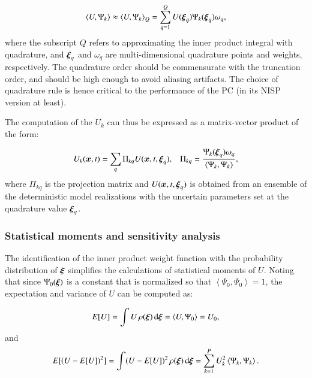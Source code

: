 \begin{equation}
  \left< U, \Psi_k \right> 
\approx \left< U, \Psi_k \right>_Q
= \sum_{q=1}^Q U(\xxi_q) \Psi_k(\xxi_q) \omega_q,
\end{equation}
where the subscript $Q$ refers to approximating the inner product integral with
quadrature, and $\xxi_q$ and $\omega_q$ are multi-dimensional quadrature points and weights,
respectively. The quadrature order should be commensurate with the
truncation order, and should be high enough to avoid aliasing artifacts.
The choice of quadrature rule is hence critical to the performance
of the PC (in its NISP version at least). 

The computation of the ${U}_k$ can thus be expressed as a matrix-vector product of the form:

\begin{equation} 
 U_k(\bm{x},t)=\sum_q \Pi_{kq} U(\bm{x},t,\xxi_q),\;\;\;
 \Pi_{kq}=\frac{\Psi_k(\xxi_q)\omega_q}{\left< \Psi_k, \Psi_k \right>},
\end{equation} 
where $\Pi_{kq}$ is the projection matrix and $U(\bm{x},t,\xxi_q)$ is obtained
from an ensemble of the deterministic model realizations with the uncertain parameters set at
the quadrature value $\xxi_q$. 


\subsubsection{Statistical moments and sensitivity analysis}
The identification of the inner product weight function
with the probability distribution of $\xxi$ simplifies the calculations of statistical moments of $U$. 
Noting that since $\Psi_0(\xxi)$ is a constant that is normalized so that 
$\left<\Psi_0,\Psi_0\right>=1$, the expectation and variance of $U$ can be computed as:

\begin{equation}
 E[U] = \int U \, \rho(\xxi) \, \mbox{d}\xxi=\left< U,\Psi_0\right> = U_0,  
 \label{eq:mean}
\end{equation}
and \begin{equation}
 E[(U-E[U])^2] = \int (U-E[U])^2 \, \rho(\xxi) \, \mbox{d}\xxi=\sum_{k=1}^P U_k^2
 \label{eq:sigma}
\left<\Psi_k,\Psi_k\right>.
\end{equation}

